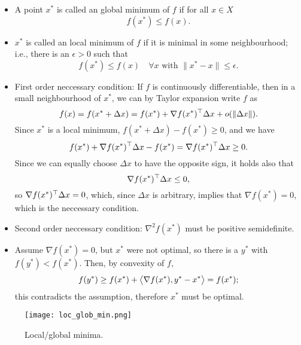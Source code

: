 \documentclass{article}
\begin{document}
\begin{itemize}
\item A point \(x^*\) is called an global minimum of \(f\) if for all \(x \in X\)
  \begin{equation*}
    f(x^*) \leq f(x).
  \end{equation*}
\item \(x^*\) is called an local minimum of \(f\) if it is minimal in some neighbourhood; i.e.,
  there is an \(\epsilon > 0\) such that
  \begin{equation*}
    f(x^*) \leq f(x) \quad \forall x \text{ with } \lVert x^* - x \rVert \leq \epsilon.
  \end{equation*}
\item First order neccessary condition: If \(f\) is continuously differentiable, then in a small
  neighbourhood of \(x^*\), we can by Taylor expansion write \(f\) as
  \begin{equation*}
    f(x) = f(x^* + \Delta x) = f(x^*) + \nabla f(x^*)^{\top} \Delta x + o(\lVert \Delta x \rVert).
  \end{equation*}
  Since \(x^*\) is a local minimum, \(f(x^* + \Delta x) - f(x^*) \geq 0\), and we have
  \begin{equation*}
    f(x^*) + \nabla f(x^*)^{\top} \Delta x - f(x^*) = \nabla f(x^*)^{\top} \Delta x \geq 0.
  \end{equation*}
  Since we can equally choose \(\Delta x\) to have the opposite sign, it holds also that
  \begin{equation*}
    \nabla f(x^*)^{\top} \Delta x \leq 0,
  \end{equation*}
  so \(\nabla f(x^*)^{\top} \Delta x = 0\), which, since \(\Delta x\) is arbitrary, implies that
  \(\nabla f(x^*) = 0\), which is the neccessary condition.
\item Second order neccessary condition: \(\nabla^2 f(x^*)\) must be positive semidefinite.
\item Assume \(\nabla f(x^*) = 0\), but \(x^*\) were not optimal, so there is a \(y^*\) with
  \(f(y^*) < f(x^*)\).  Then, by convexity of \(f\),
\begin{equation*}
  f(y^*) \geq f(x^*) + \left\langle \nabla f(x^*), y^* - x^* \right\rangle = f(x^*);
\end{equation*}
this contradicts the assumption, therefore \(x^*\) must be optimal.
\end{itemize}

\begin{figure}[H]
  \texttt{[image: loc\_glob\_min.png]}
  \caption{Local/global minima.\label{fig:min}}
\end{figure}
\end{document}
